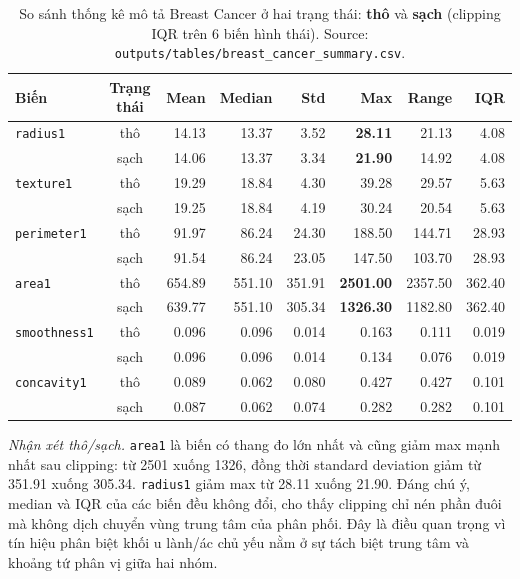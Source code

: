 \begin{table}[H]
\centering
\caption[Thống kê thô/sạch Breast Cancer]{So sánh thống kê mô tả Breast Cancer ở hai trạng thái: \textbf{thô} và \textbf{sạch} (clipping IQR trên 6 biến hình thái). Source: \texttt{outputs/tables/breast\_cancer\_summary.csv}.}
\label{tab:ch4_breast_stats_raw_clean}
\footnotesize
\setlength{\tabcolsep}{4pt}
\begin{tabular}{lcrrrrrr}
\toprule
Biến & Trạng thái & Mean & Median & Std & \textbf{Max} & \textbf{Range} & IQR \\
\midrule
\texttt{radius1} & thô & 14.13 & 13.37 & 3.52 & \textbf{28.11} & 21.13 & 4.08 \\
 & sạch & 14.06 & 13.37 & 3.34 & \textbf{21.90} & 14.92 & 4.08 \\
\midrule
\texttt{texture1} & thô & 19.29 & 18.84 & 4.30 & 39.28 & 29.57 & 5.63 \\
 & sạch & 19.25 & 18.84 & 4.19 & 30.24 & 20.54 & 5.63 \\
\midrule
\texttt{perimeter1} & thô & 91.97 & 86.24 & 24.30 & 188.50 & 144.71 & 28.93 \\
 & sạch & 91.54 & 86.24 & 23.05 & 147.50 & 103.70 & 28.93 \\
\midrule
\texttt{area1} & thô & 654.89 & 551.10 & 351.91 & \textbf{2501.00} & 2357.50 & 362.40 \\
 & sạch & 639.77 & 551.10 & 305.34 & \textbf{1326.30} & 1182.80 & 362.40 \\
\midrule
\texttt{smoothness1} & thô & 0.096 & 0.096 & 0.014 & 0.163 & 0.111 & 0.019 \\
 & sạch & 0.096 & 0.096 & 0.014 & 0.134 & 0.076 & 0.019 \\
\midrule
\texttt{concavity1} & thô & 0.089 & 0.062 & 0.080 & 0.427 & 0.427 & 0.101 \\
 & sạch & 0.087 & 0.062 & 0.074 & 0.282 & 0.282 & 0.101 \\
\bottomrule
\end{tabular}
\end{table}

\textit{Nhận xét thô/sạch.} \texttt{area1} là biến có thang đo lớn nhất và cũng giảm max mạnh nhất sau clipping: từ 2501 xuống 1326, đồng thời standard deviation giảm từ 351.91 xuống 305.34. \texttt{radius1} giảm max từ 28.11 xuống 21.90. Đáng chú ý, median và IQR của các biến đều không đổi, cho thấy clipping chỉ nén phần đuôi mà không dịch chuyển vùng trung tâm của phân phối. Đây là điều quan trọng vì tín hiệu phân biệt khối u lành/ác chủ yếu nằm ở sự tách biệt trung tâm và khoảng tứ phân vị giữa hai nhóm.

